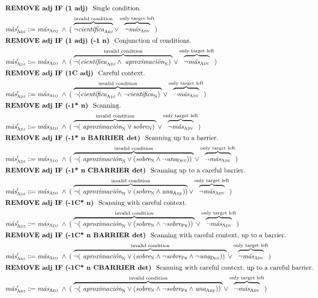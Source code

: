 \begin{align}
%
\intertext{\cgrule{REMOVE adj IF (1 adj)} Single condition.} 
\newVar \mas{}'_\adj 
      & \eqdef \masAdj\ 
        \wedge\: ( \; \ob{\neg\cientificaAdj}^{\invConds} 
        \vee  \ob{\neg\masAdv}^{\onlyTrgLeft} ) \\
%
%
\intertext{\cgrule{REMOVE adj IF (1 adj) (-1 n)} Conjunction of conditions.}
\newVar \mas{}'_\adj 
      & \eqdef \masAdj\ 
       \wedge\: ( \; \ob{\neg ( \cientificaAdj \wedge \aproximacionN )\;}^{\invConds} 
       \vee  \ob{\neg\masAdv}^{\onlyTrgLeft} ) \\
%
%
\intertext{\cgrule{REMOVE adj IF (1C adj)} Careful context.} %
  \newVar \mas{}'_\adj 
     & \eqdef \masAdj\ 
     \wedge\: ( \; \ob{\neg ( \cientificaAdj \wedge \neg \cientificaN )\;}^{\invConds} 
     \vee \ob{\neg\masAdv}^{\onlyTrgLeft}  )  \\
%
%
\intertext{\cgrule{REMOVE adj IF (-1* n)} Scanning.}
  \newVar \mas{}'_\adj 
     & \eqdef \masAdj\ 
     \wedge\: ( \; \ob{\neg ( \aproximacionN \vee \sobreN )\;}^{\invConds} 
     \vee \ob{\neg\masAdv}^{\onlyTrgLeft} ) \\
%
%
\intertext{\cgrule{REMOVE adj IF (-1* n BARRIER det)} Scanning up to a barrier. }
  \newVar \mas{}'_\adj 
     & \eqdef \masAdj\ 
     \wedge\: ( \; \ob{\neg ( \aproximacionN \vee (\sobreN \wedge \neg\unaDet))\;}^{\invConds} 
     \vee \ob{\neg\masAdv}^{\onlyTrgLeft} )  \\
%
%
\intertext{\cgrule{REMOVE adj IF (-1* n CBARRIER det)} Scanning up to a careful barrier. }
  \newVar \mas{}'_\adj 
     & \eqdef \masAdj\ 
     \wedge\: ( \; \ob{\neg ( \aproximacionN \vee (\sobreN \wedge \unaAny)) }^{\invConds} 
     \vee \ob{\neg\masAdv}^{\onlyTrgLeft} ) \\
%
%
\intertext{\cgrule{REMOVE adj IF (-1C* n)} Scanning with careful context.} %
  \newVar \mas{}'_\adj 
     & \eqdef \masAdj\ 
     \wedge\: ( \; \ob{\neg (\aproximacionN \vee (\sobreN \wedge \neg\sobrePr))\;}^{\invConds} 
     \vee \ob{\neg\masAdv}^{\onlyTrgLeft} ) \\
%
%
\intertext{\cgrule{REMOVE adj IF (-1C* n BARRIER det)} Scanning with careful context, up to a barrier.}
  \newVar \mas{}'_\adj 
     & \eqdef \masAdj\ 
     \wedge\: ( \; \ob{\neg (\aproximacionN \vee  (\sobreN \wedge \neg\sobrePr \wedge \neg\unaDet))\;}^{\invConds} 
     \vee \ob{\neg\masAdv}^{\onlyTrgLeft} )  \\
%
%
\intertext{\cgrule{REMOVE adj IF (-1C* n CBARRIER det)} Scanning with careful context, up to a careful barrier.}
  \newVar \mas{}'_\adj 
     & \eqdef \masAdj\ 
     \wedge\: ( \; \ob{\neg (\aproximacionN \vee  (\sobreN \wedge \neg\sobrePr \wedge \unaAny))\;}^{\invConds} 
     \vee \ob{\neg\masAdv}^{\onlyTrgLeft} ) 
\end{align}




